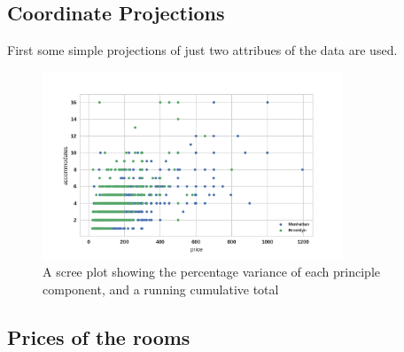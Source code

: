 \documentclass[12pt]{article}
\begin{document}
\subsection{Coordinate Projections}
First some simple projections of just two attribues of the data are used.
\begin{figure}[htb]
\centering
\includegraphics[width = 0.8\textwidth]{images/pair-acc-price.png}
\caption{ A scree plot showing the percentage variance of each principle component, and a running cumulative total}
\label{fig:pair-acc-price}
\end{figure}
\subsection{Prices of the rooms}
\end{document}
